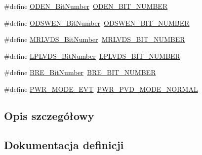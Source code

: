 \begin{DoxyCompactItemize}
\item 
\#define \hyperlink{group___h_a_l___p_w_r___aliased_ga2f24ddbcbc5b8d74c0b032cfa53c725a}{O\+D\+E\+N\+\_\+\+Bit\+Number}~\hyperlink{group___p_w_r_ex__register__alias__address_gace51402e8067c2b478e3bcbc6efe0b70}{O\+D\+E\+N\+\_\+\+B\+I\+T\+\_\+\+N\+U\+M\+B\+ER}
\item 
\#define \hyperlink{group___h_a_l___p_w_r___aliased_gaf2e21cacf95f557d2535d623c41577c2}{O\+D\+S\+W\+E\+N\+\_\+\+Bit\+Number}~\hyperlink{group___p_w_r_ex__register__alias__address_gaedd8b85a6ee45b4816a46e7295525d50}{O\+D\+S\+W\+E\+N\+\_\+\+B\+I\+T\+\_\+\+N\+U\+M\+B\+ER}
\item 
\#define \hyperlink{group___h_a_l___p_w_r___aliased_ga50e53827046644c175fe431eea5f4261}{M\+R\+L\+V\+D\+S\+\_\+\+Bit\+Number}~\hyperlink{group___p_w_r_ex__register__alias__address_ga28a0fb2b4631ef67fa151764489fbf24}{M\+R\+L\+V\+D\+S\+\_\+\+B\+I\+T\+\_\+\+N\+U\+M\+B\+ER}
\item 
\#define \hyperlink{group___h_a_l___p_w_r___aliased_ga7ebe7d965ce7638645ee9a5e35c01be7}{L\+P\+L\+V\+D\+S\+\_\+\+Bit\+Number}~\hyperlink{group___p_w_r_ex__register__alias__address_ga275a1c9f059c6d03973211a12b88311f}{L\+P\+L\+V\+D\+S\+\_\+\+B\+I\+T\+\_\+\+N\+U\+M\+B\+ER}
\item 
\#define \hyperlink{group___h_a_l___p_w_r___aliased_ga1a0832bfe421cdd6f2640ffb625cc2d8}{B\+R\+E\+\_\+\+Bit\+Number}~\hyperlink{group___p_w_r_ex___c_s_r__register__alias_gabe84749fda066b71a64a1eec61032181}{B\+R\+E\+\_\+\+B\+I\+T\+\_\+\+N\+U\+M\+B\+ER}
\item 
\#define \hyperlink{group___h_a_l___p_w_r___aliased_ga1092f618f6edca6f56e410e926455774}{P\+W\+R\+\_\+\+M\+O\+D\+E\+\_\+\+E\+VT}~\hyperlink{group___p_w_r___p_v_d___mode_ga3a4bf701a36a14a4edf4dc5a28153277}{P\+W\+R\+\_\+\+P\+V\+D\+\_\+\+M\+O\+D\+E\+\_\+\+N\+O\+R\+M\+AL}
\end{DoxyCompactItemize}


\subsection{Opis szczegółowy}


\subsection{Dokumentacja definicji}
\mbox{\label{group___h_a_l___p_w_r___aliased_ga1a0832bfe421cdd6f2640ffb625cc2d8}} 
